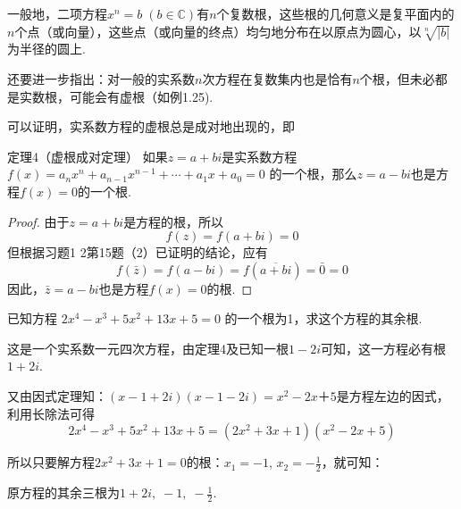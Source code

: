 一般地，二项方程$x^n=b\; (b\in\mathbb{C})$有$n$个复数根，这些根的几何意义是复平面内的$n$个点（或向量），这些点（或向量的终点）均匀地分布在以原点为圆心，以$\sqrt[n]{|b|}$为半径的圆上.

还要进一步指出：对一般的实系数$n$次方程在复数集内也是恰有$n$个根，但未必都是实数根，可能会有虚根（如例1.25).

可以证明，实系数方程的虚根总是成对地出现的，即

\begin{blk}{定理4（虚根成对定理）}
如果$z=a+bi$是实系数方程
$f(x)=a_nx^n+a_{n-1}x^{n-1}+\cdots+a_1x+a_0=0$
的一个根，那么$z=a-bi$也是方程$f(x)=0$的一个根.
\end{blk}

\begin{proof}
    由于$z=a+bi$是方程的根，所以
\[f(z)=f(a+bi)=0\]
但根据习题1 2第15题（2）已证明的结论，应有
\[f(\bar z)=f(a-bi)=f(\overline{a+bi})=\bar 0=0\]
因此，$\bar z=a-bi$也是方程$f(x)=0$的根.
\end{proof}

\begin{example}
    已知方程
$2x^4-x^3+5x^2+13x+5=0$
的一个根为1，求这个方程的其余根.
\end{example}

\begin{solution}
    这是一个实系数一元四次方程，由定理4及已知一根$1-2i$可知，这一方程必有根$1+2i$.

又由因式定理知：$(x-1+2i)(x-1-2i)=x^2-2x＋5$是方程左边的因式，利用长除法可得
\[2x^4-x^3+5x^2+13x+5=(2x^2+3x+1)(x^2-2x+5)\]

所以只要解方程$2x^2+3x+1=0$的根：$x_1=-1$, $x_2=-\frac{1}{2}$，就可知：

原方程的其余三根为$1+2i,\; -1,\; -\frac{1}{2}$.
\end{solution}

